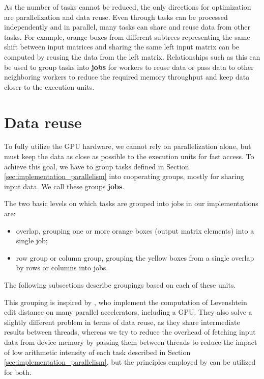
As the number of tasks cannot be reduced, the only directions for optimization are parallelization and data reuse. Even through tasks can be processed independently and in parallel, many tasks can share and reuse data from other tasks. For example, orange boxes from different subtrees representing the same shift between input matrices and sharing the same left input matrix can be computed by reusing the data from the left matrix. Relationships such as this can be used to group tasks into \textbf{jobs} for workers to reuse data or pass data to other neighboring workers to reduce the required memory throughput and keep data closer to the execution units. 

\section{Data reuse}
\label{sec:data_reuse}
To fully utilize the GPU hardware, we cannot rely on parallelization alone, but must keep the data as close as possible to the execution units for fast access. To achieve this goal, we have to group tasks defined in Section \ref{sec:implementation_parallelism} into cooperating groups, mostly for sharing input data. We call these groups \textbf{jobs}.


The two basic levels on which tasks are grouped into jobs in our implementations are:
\begin{itemize}
	\item overlap, grouping one or more orange boxes (output matrix elements) into a single job;
	\item row group or column group, grouping the yellow boxes from a single overlap by rows or columns into jobs.
\end{itemize}

The following subsections describe groupings based on each of these units.

This grouping is inspired by \citet{paper:levenstein}, who implement the computation of Levenshtein edit distance on many parallel accelerators, including a GPU. They also solve a slightly different problem in terms of data reuse, as they share intermediate results between threads, whereas we try to reduce the overhead of fetching input data from device memory by passing them between threads to reduce the impact of low arithmetic intensity of each task described in Section \ref{sec:implementation_parallelism}, but the principles employed by \citet{paper:levenstein} can be utilized for both.





